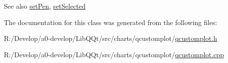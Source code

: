 \begin{DoxySeeAlso}{See also}
\mbox{\hyperlink{class_q_c_p_item_rect_a483c0da5a17e1646cd17ddea2c124e7d}{set\+Pen}}, \mbox{\hyperlink{class_q_c_p_abstract_item_a203de94ad586cc44d16c9565f49d3378}{set\+Selected}} 
\end{DoxySeeAlso}


The documentation for this class was generated from the following files\+:\begin{DoxyCompactItemize}
\item 
R\+:/\+Develop/a0-\/develop/\+Lib\+Q\+Qt/src/charts/qcustomplot/\mbox{\hyperlink{qcustomplot_8h}{qcustomplot.\+h}}\item 
R\+:/\+Develop/a0-\/develop/\+Lib\+Q\+Qt/src/charts/qcustomplot/\mbox{\hyperlink{qcustomplot_8cpp}{qcustomplot.\+cpp}}\end{DoxyCompactItemize}
